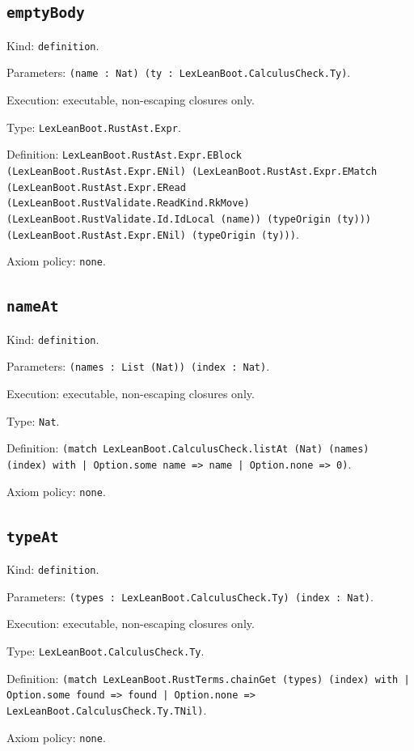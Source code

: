 \documentclass[11pt]{article}
\begin{document}
\subsection*{\texttt{emptyBody}}
\noindent Kind: \texttt{definition}.\par
\noindent Parameters: \texttt{(name : Nat) (ty : LexLeanBoot.CalculusCheck.Ty)}.\par
\noindent Execution: executable, non-escaping closures only.\par
\noindent Type: \texttt{LexLeanBoot.RustAst.Expr}.\par
\noindent Definition: \texttt{LexLeanBoot.RustAst.Expr.EBlock (LexLeanBoot.RustAst.Expr.ENil) (LexLeanBoot.RustAst.Expr.EMatch (LexLeanBoot.RustAst.Expr.ERead (LexLeanBoot.RustValidate.ReadKind.RkMove) (LexLeanBoot.RustValidate.Id.IdLocal (name)) (typeOrigin (ty))) (LexLeanBoot.RustAst.Expr.ENil) (typeOrigin (ty)))}.\par
\noindent Axiom policy: \texttt{none}.\par
\subsection*{\texttt{nameAt}}
\noindent Kind: \texttt{definition}.\par
\noindent Parameters: \texttt{(names : List (Nat)) (index : Nat)}.\par
\noindent Execution: executable, non-escaping closures only.\par
\noindent Type: \texttt{Nat}.\par
\noindent Definition: \texttt{(match LexLeanBoot.CalculusCheck.listAt (Nat) (names) (index) with | Option.some name => name | Option.none => 0)}.\par
\noindent Axiom policy: \texttt{none}.\par
\subsection*{\texttt{typeAt}}
\noindent Kind: \texttt{definition}.\par
\noindent Parameters: \texttt{(types : LexLeanBoot.CalculusCheck.Ty) (index : Nat)}.\par
\noindent Execution: executable, non-escaping closures only.\par
\noindent Type: \texttt{LexLeanBoot.CalculusCheck.Ty}.\par
\noindent Definition: \texttt{(match LexLeanBoot.RustTerms.chainGet (types) (index) with | Option.some found => found | Option.none => LexLeanBoot.CalculusCheck.Ty.TNil)}.\par
\noindent Axiom policy: \texttt{none}.\par
\end{document}
